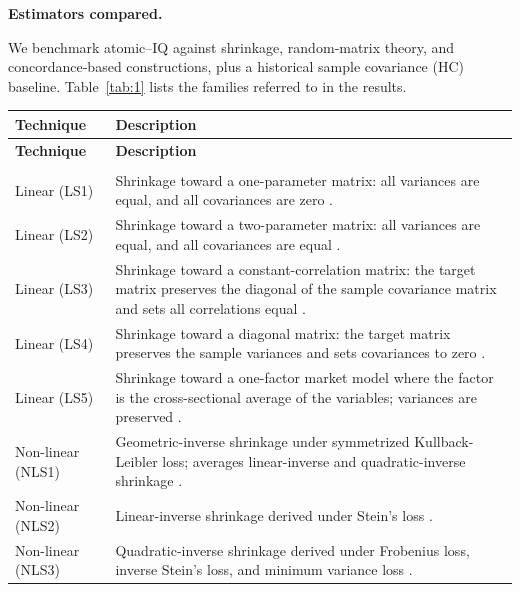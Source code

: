 \documentclass[12pt,letterpaper]{article}
\begin{document}
\vspace{0.35em}
\noindent\textbf{Estimators compared.}

We benchmark atomic–IQ against shrinkage, random‑matrix theory, and concordance‑based constructions, plus a historical sample covariance (HC) baseline. Table~\ref{tab:1} lists the families referred to in the results.\\

\begingroup
\footnotesize
\setlength{\LTpre}{0pt}
\setlength{\LTpost}{0pt}
\begin{longtable}{>{\raggedright\arraybackslash}p{3.5cm} >{\raggedright\arraybackslash}p{10.0cm}}
\toprule
\textbf{Technique} & \textbf{Description} \\
\midrule
\endfirsthead

\toprule
\textbf{Technique} & \textbf{Description} \\
\midrule
\endhead

\multicolumn{2}{l}{\textbf{Shrinkage}} \\
Linear (LS1) &
Shrinkage toward a one-parameter matrix: all variances are equal, and all covariances are zero \citep{ledoit2004well}. \\
Linear (LS2) &
Shrinkage toward a two-parameter matrix: all variances are equal, and all covariances are equal \citep{ledoit1995essays}. \\
Linear (LS3) &
Shrinkage toward a constant-correlation matrix: the target matrix preserves the diagonal of the sample covariance matrix and sets all correlations equal \citep{ledoit2004honey}. \\
Linear (LS4) &
Shrinkage toward a diagonal matrix: the target matrix preserves the sample variances and sets covariances to zero \citep{ledoit1995essays}. \\
Linear (LS5) &
Shrinkage toward a one-factor market model where the factor is the cross-sectional average of the variables; variances are preserved \citep{ledoit2003improved}. \\
Non-linear (NLS1) &
Geometric-inverse shrinkage under symmetrized Kullback-Leibler loss; averages linear-inverse and quadratic-inverse shrinkage \citep{ledoit2022quadratic}. \\
Non-linear (NLS2) &
Linear-inverse shrinkage derived under Stein's loss \citep{ledoit2022quadratic}. \\
Non-linear (NLS3) &
Quadratic-inverse shrinkage derived under Frobenius loss, inverse Stein's loss, and minimum variance loss \citep{ledoit2022quadratic}. \\


\end{longtable}
\end{document}
